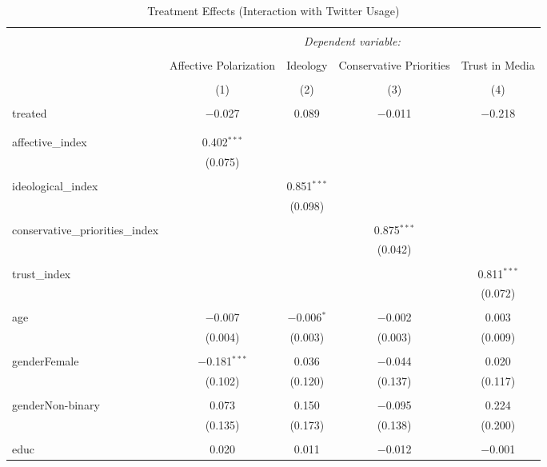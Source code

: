 
\begin{table}[!htbp] \centering 
  \caption{Treatment Effects (Interaction with Twitter Usage)} 
  \label{} 
\begin{tabular}{@{\extracolsep{5pt}}lcccc} 
\\[-1.8ex]\hline 
\hline \\[-1.8ex] 
 & \multicolumn{4}{c}{\textit{Dependent variable:}} \\ 
\cline{2-5} 
\\[-1.8ex] & Affective Polarization & Ideology & Conservative Priorities & Trust in Media \\ 
\\[-1.8ex] & (1) & (2) & (3) & (4)\\ 
\hline \\[-1.8ex] 
 treated & $-$0.027 & 0.089 & $-$0.011 & $-$0.218 \\ 
  &  &  &  &  \\ 
  & & & & \\ 
 affective\_index & 0.402$^{***}$ &  &  &  \\ 
  & (0.075) &  &  &  \\ 
  & & & & \\ 
 ideological\_index &  & 0.851$^{***}$ &  &  \\ 
  &  & (0.098) &  &  \\ 
  & & & & \\ 
 conservative\_priorities\_index &  &  & 0.875$^{***}$ &  \\ 
  &  &  & (0.042) &  \\ 
  & & & & \\ 
 trust\_index &  &  &  & 0.811$^{***}$ \\ 
  &  &  &  & (0.072) \\ 
  & & & & \\ 
 age & $-$0.007 & $-$0.006$^{*}$ & $-$0.002 & 0.003 \\ 
  & (0.004) & (0.003) & (0.003) & (0.009) \\ 
  & & & & \\ 
 genderFemale & $-$0.181$^{***}$ & 0.036 & $-$0.044 & 0.020 \\ 
  & (0.102) & (0.120) & (0.137) & (0.117) \\ 
  & & & & \\ 
 genderNon-binary & 0.073 & 0.150 & $-$0.095 & 0.224 \\ 
  & (0.135) & (0.173) & (0.138) & (0.200) \\ 
  & & & & \\ 
 educ & 0.020 & 0.011 & $-$0.012 & $-$0.001 \\ 

\end{tabular}
\end{table}
